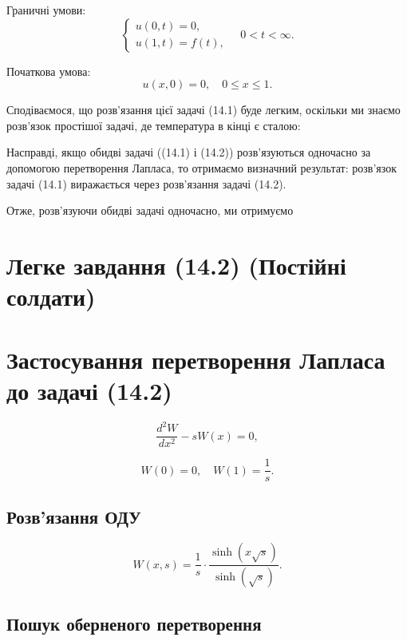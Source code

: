 \documentclass[
  ukrainian,
]{article}
\begin{document}
Граничні умови: \[
\begin{cases}
u(0, t) = 0, \\
u(1, t) = f(t),
\end{cases}
\quad 0 < t < \infty.
\]

Початкова умова: \[
u(x, 0) = 0, \quad 0 \le x \le 1.
\]

Сподіваємося, що розв'язання цієї задачі (14.1) буде легким, оскільки ми
знаємо розв'язок простішої задачі, де температура в кінці є сталою:

Насправді, якщо обидві задачі ((14.1) і (14.2)) розв'язуються одночасно
за допомогою перетворення Лапласа, то отримаємо визначний результат:
розв'язок задачі (14.1) виражається через розв'язання задачі (14.2).

Отже, розв'язуючи обидві задачі одночасно, ми отримуємо

\section{Легке завдання (14.2) (Постійні
солдати)}\label{ux43bux435ux433ux43aux435-ux437ux430ux432ux434ux430ux43dux43dux44f-14.2-ux43fux43eux441ux442ux456ux439ux43dux456-ux441ux43eux43bux434ux430ux442ux438}

\section{Застосування перетворення Лапласа до задачі
(14.2)}\label{ux437ux430ux441ux442ux43eux441ux443ux432ux430ux43dux43dux44f-ux43fux435ux440ux435ux442ux432ux43eux440ux435ux43dux43dux44f-ux43bux430ux43fux43bux430ux441ux430-ux434ux43e-ux437ux430ux434ux430ux447ux456-14.2}

\[
\frac{d^2 W}{dx^2} - s W(x) = 0,
\]

\[
W(0) = 0, \quad W(1) = \frac{1}{s}.
\]

\subsection{Розв'язання
ОДУ}\label{ux440ux43eux437ux432ux44fux437ux430ux43dux43dux44f-ux43eux434ux443}

\[
W(x, s) = \frac{1}{s} \cdot \frac{\sinh(x \sqrt{s})}{\sinh(\sqrt{s})}.
\]

\subsection{Пошук оберненого
перетворення}\label{ux43fux43eux448ux443ux43a-ux43eux431ux435ux440ux43dux435ux43dux43eux433ux43e-ux43fux435ux440ux435ux442ux432ux43eux440ux435ux43dux43dux44f}
\end{document}

